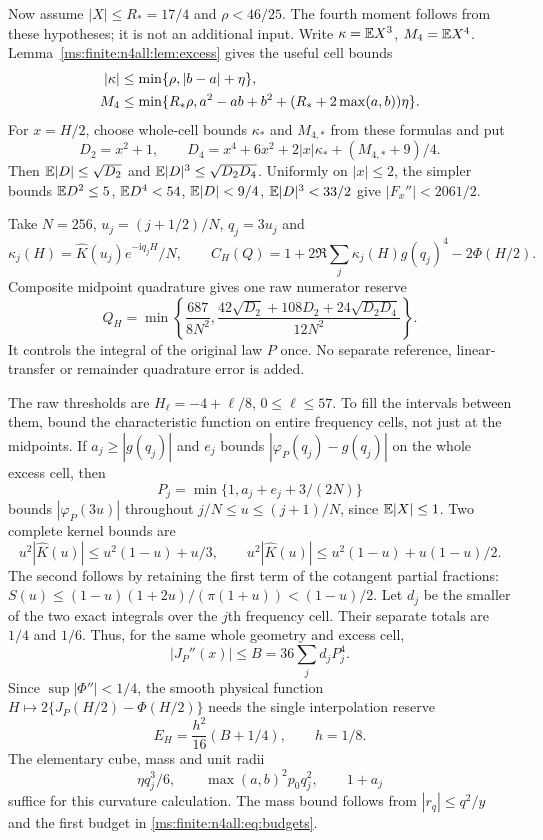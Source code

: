 Now assume $|X|\le R_*=17/4$ and $\rho<46/25$.
The fourth moment follows from these hypotheses; it is not an
additional input. Write $\kappa=\mathbb E X^3$, $M_4=\mathbb E X^4$.
Lemma~\ref{ms:finite:n4all:lem:excess} gives the useful cell bounds
\begin{align}
 |\kappa|&\le\min\{\rho,|b-a|+\eta\},\notag\\
 M_4&\le\min\{R_*\rho, a^2-ab+b^2+
                         (R_*+2\max(a,b))\eta\}.
 \label{ms:finite:n4all:eq:local-moments}
\end{align}
For $x=H/2$, choose whole-cell bounds $\kappa_*$ and $M_{4,*}$
from these formulas and put
\[
 D_2=x^2+1,\qquad
 D_4=x^4+6x^2+2|x|\kappa_*+(M_{4,*}+9)/4.
\]
Then $\mathbb E|D|\le\sqrt{D_2}$ and
$\mathbb E|D|^3\le\sqrt{D_2D_4}$. Uniformly on $|x|\le2$, the simpler
bounds $\mathbb E D^2\le5$, $\mathbb E D^4<54$, $\mathbb E|D|<9/4$,
$\mathbb E|D|^3<33/2$ give $|F_x''|<2061/2$.

Take $N=256$, $u_j=(j+1/2)/N$, $q_j=3u_j$ and
\[
 \kappa_j(H)=\widehat K(u_j)e^{-\mathrm i q_jH}/N,\qquad
 C_H(Q)=1+2\Re\sum_j\kappa_j(H)g(q_j)^4-2\Phi(H/2).
\]
Composite midpoint quadrature gives one raw numerator reserve
\begin{equation}\label{ms:finite:n4all:eq:midpoint}
 Q_H=\min\left\{\frac{687}{8N^2},
 \frac{42\sqrt{D_2}+108D_2+24\sqrt{D_2D_4}}{12N^2}\right\}.
\end{equation}
It controls the integral of the original law $P$ once. No separate
reference, linear-transfer or remainder quadrature error is added.

The raw thresholds are $H_\ell=-4+\ell/8$, $0\le\ell\le57$.
To fill the intervals between them, bound the characteristic function
on entire frequency cells, not just at the midpoints. If
$a_j\ge|g(q_j)|$ and $e_j$ bounds $|\varphi_P(q_j)-g(q_j)|$ on the
whole excess cell, then
\[
 P_j=\min\{1,a_j+e_j+3/(2N)\}
\]
bounds $|\varphi_P(3u)|$ throughout $j/N\le u\le(j+1)/N$,
since $\mathbb E|X|\le1$. Two complete kernel bounds are
\[
 u^2|\widehat K(u)|\le u^2(1-u)+u/3,\qquad
 u^2|\widehat K(u)|\le u^2(1-u)+u(1-u)/2.
\]
The second follows by retaining the first term of the cotangent
partial fractions:
$S(u)\le(1-u)(1+2u)/(\pi(1+u))<(1-u)/2$.
Let $d_j$ be the smaller of the two exact integrals over the $j$th
frequency cell. Their separate totals are $1/4$ and $1/6$.
Thus, for the same whole geometry and excess cell,
\[
 |J_P''(x)|\le B=36\sum_jd_jP_j^4.
\]
Since $\sup|\Phi''|<1/4$, the smooth physical function
$H\mapsto2\{J_P(H/2)-\Phi(H/2)\}$ needs the single interpolation
reserve
\begin{equation}\label{ms:finite:n4all:eq:H-reserve}
 E_H=\frac{h^2}{16}(B+1/4),\qquad h=1/8.
\end{equation}
The elementary cube, mass and unit radii
\[
 \eta q_j^3/6,\qquad \max(a,b)^2p_0q_j^2,\qquad 1+a_j
\]
suffice for this curvature calculation. The mass bound follows from
$|r_q|\le q^2/y$ and the first budget in
\eqref{ms:finite:n4all:eq:budgets}.

